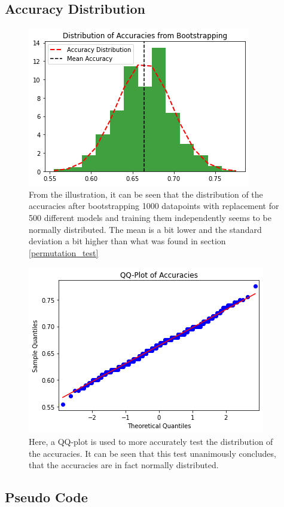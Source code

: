 \documentclass[11pt, fleqn, titlepage]{article}
\begin{document}
	\subsection{Accuracy Distribution}
	\begin{figure}[H]
		\centering
		\includegraphics[width=0.5\linewidth]{imgs/accuracy_distribution}
		\caption{From the illustration, it can be seen that the distribution of the accuracies after bootstrapping 1000 datapoints with replacement for 500 different models and training them independently seems to be normally distributed. The mean is a bit lower and the standard deviation a bit higher than what was found in section \ref{permutation_test}}
		\label{fig:accuracydistribution}
	\end{figure}
	
	\begin{figure}[H]
		\centering
		\includegraphics[width=0.5\linewidth]{imgs/qqplot_accuracies}
		\caption{Here, a QQ-plot is used to more accurately test the  distribution of the accuracies. It can be seen that this test unanimously concludes, that the accuracies are in fact normally distributed.}
		\label{fig:qqplotaccuracies}
	\end{figure}
	
	
	\subsection{Pseudo Code}\label{pseudo_code}
\end{document}
